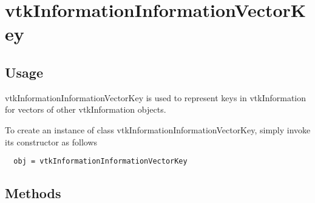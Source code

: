 \section{vtkInformationInformationVectorKey}

\subsection{Usage}

 vtkInformationInformationVectorKey is used to represent keys in
 vtkInformation for vectors of other vtkInformation objects.

To create an instance of class vtkInformationInformationVectorKey, simply
invoke its constructor as follows
\begin{verbatim}
  obj = vtkInformationInformationVectorKey
\end{verbatim}
\subsection{Methods}

